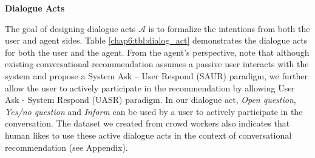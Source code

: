 \textbf{Dialogue Acts}
\label{chap6:sec:dialog_act}

The goal of designing dialogue acts $\mathcal{A}$ is to formalize the intentions from both the user and agent sides. 
Table \ref{chap6:tbl:dialog_act} demonstrates the dialogue acts for both the user and the agent.
From the agent's perspective, 
note that although existing conversational recommendation\cite{sun2018conversational,li2018towards,zhang2018towards} assumes a passive user interacts with the system and propose a System Ask – User Respond (SAUR) paradigm, we further allow the user to actively participate in the recommendation by allowing User Ask - System Respond (UASR) paradigm. In our dialogue act, \textit{Open question}, \textit{Yes/no question} and \textit{Inform} can be used by a user to actively participate in the conversation. The dataset we created from crowd workers also indicates that human likes to use these active dialogue acts in the context of conversational recommendation (see Appendix).



